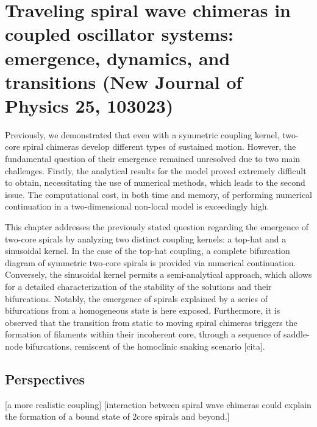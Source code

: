 \chapter{Traveling spiral wave chimeras in coupled
oscillator systems: emergence, dynamics, and
transitions (New Journal of Physics 25, 103023)}

Previously, we demonstrated that even with a symmetric coupling kernel, two-core spiral chimeras develop different
types of sustained motion. However, the fundamental question of their emergence remained
unresolved due to two main challenges. Firstly, the analytical results for the model proved
extremely difficult to obtain, necessitating the use of numerical methods, which leads to the second 
issue. The computational cost, in both time
and memory, of performing numerical continuation in a two-dimensional non-local model is exceedingly high.

This chapter addresses the previously stated question regarding the emergence of two-core spirals by analyzing two distinct coupling kernels: a
top-hat and a sinusoidal kernel. In the case of the top-hat coupling, a complete bifurcation diagram of symmetric two-core spirals
is provided via numerical continuation. Conversely, the sinusoidal kernel
permits a semi-analytical approach, which allows for a detailed 
characterization of the stability of the solutions and their bifurcations. Notably,
the emergence of spirals explained by a series of bifurcations from a homogeneous
state is here exposed. Furthermore, it is observed that the transition from static to moving spiral chimeras
triggers the formation of filaments within their incoherent core, through a sequence of saddle-node
bifurcations, remiscent of the homoclinic snaking scenario [cita]. 



\section{Perspectives}

[a more realistic coupling]
[interaction between spiral wave chimeras could explain the formation of a bound state of 
2core spirals and beyond.]